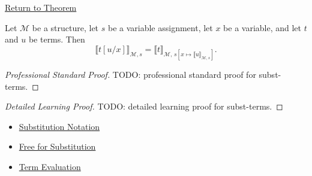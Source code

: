 \newpage
{}
\label{prf:subst-terms}

\begin{remark*}[Return]
\hyperref[lem:subst-terms]{Return to Theorem}
\end{remark*}

\begin{lemma*}
Let \(\mathcal M\) be a structure, let \(s\) be a variable assignment, let
\(x\) be a variable, and let \(t\) and \(u\) be terms. Then
\[
\llbracket t[u/x]\rrbracket_{\mathcal M,s}
=
\llbracket t\rrbracket_{\mathcal M,\,
s[x\mapsto\llbracket u\rrbracket_{\mathcal M,s}]}.
\]
\end{lemma*}

\begin{proof}[Professional Standard Proof]
\LRAProofBodyStart
TODO: professional standard proof for subst-terms.
\end{proof}

\begin{proof}[Detailed Learning Proof]
\LRAProofBodyStart
TODO: detailed learning proof for subst-terms.
\end{proof}

\begin{remark*}
\end{remark*}

\begin{dependencies}
\begin{itemize}
  \item \hyperref[def:subst-notation]{Substitution Notation}
  \item \hyperref[def:free-for]{Free for Substitution}
  \item \hyperref[def:term-interp]{Term Evaluation}
\end{itemize}
\end{dependencies}

\clearpage
